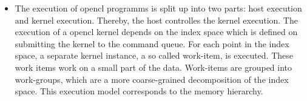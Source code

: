 \documentclass[a4paper,10pt]{article}
\begin{document}
\begin{itemize}
\item The execution of opencl programms is split up into two parts: host execution and kernel execution. Thereby, the host controlles the kernel execution. The execution of a opencl kernel depends on the index space which is defined on submitting the kernel to the command queue. For each point in the index space, a separate kernel instance, a so called work-item, is executed. These work items work on a small part of the data. Work-items are grouped into work-groups, which are  a more coarse-grained decomposition of the index space. This execution model corresponds to the memory hierarchy.

\end{itemize}
\end{document}
